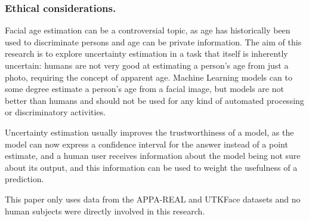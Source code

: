 \documentclass[runningheads]{llncs}
\begin{document}
\subsubsection*{Ethical considerations.}
Facial age estimation can be a controversial topic, as age has historically been used to discriminate persons and age can be private information. The aim of this research is to explore uncertainty estimation in a task that itself is inherently uncertain: humans are not very good at estimating a person's age from just a photo, requiring the concept of apparent age. Machine Learning models can to some degree estimate a person's age from a facial image, but models are not better than humans and should not be used for any kind of automated processing or discriminatory activities.

Uncertainty estimation usually improves the trustworthiness of a model, as the model can now express a confidence interval for the answer instead of a point estimate, and a human user receives information about the model being not sure about its output, and this information can be used to weight the usefulness of a prediction.

This paper only uses data from the APPA-REAL and UTKFace datasets and no human subjects were directly involved in this research.



\end{document}
